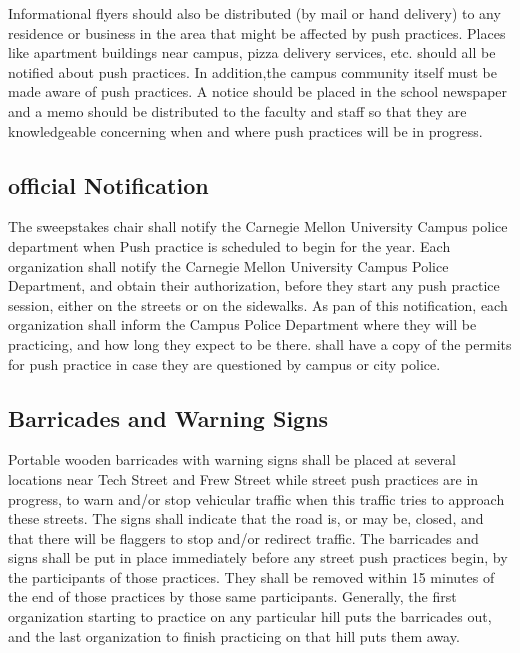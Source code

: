 \documentclass[openany]{book}
\begin{document}
Informational flyers should also be distributed (by mail or hand delivery) to any residence or business in the area that might be affected by push practices. Places like apartment buildings near campus, pizza delivery services, etc. should all be notified about push practices. In addition,the campus community itself must be made aware of push practices. A notice should be placed in the school newspaper and a memo should be distributed to the faculty and staff so that they are knowledgeable concerning when and where push practices will be in progress.

\subsection{official Notification}

The sweepstakes chair shall notify the Carnegie Mellon University Campus police department when Push practice is scheduled to begin for the year. Each organization shall notify the Carnegie Mellon University Campus Police Department, and obtain their authorization, before they start any push practice session, either on the streets or on the sidewalks. As pan of this notification, each organization shall inform the Campus Police Department where they will be practicing, and how long they expect to be there. shall have a copy of the permits for push practice in case they are questioned by campus or city police.

\subsection{Barricades and Warning Signs}

Portable wooden barricades with warning signs shall be placed at several locations near Tech Street and Frew Street while street push practices are in progress, to warn and/or stop vehicular traffic when this traffic tries to approach these streets. The signs shall indicate that the road is, or may be, closed, and that there will be flaggers to stop and/or redirect traffic. The barricades and signs shall be put in place immediately before any street push practices begin, by the participants of those practices. They shall be removed within 15 minutes of the end of those practices by those same participants. Generally, the first organization starting to practice on any particular hill puts the barricades out, and the last organization to finish practicing on that hill puts them away.
\end{document}
